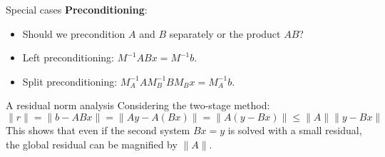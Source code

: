 \documentclass[aspectratio=169]{beamer}
\begin{document}
\begin{frame}{Special cases}
	\textbf{Preconditioning}:
	\begin{itemize}
		\item Should we precondition $A$ and $B$ separately or the product $AB$?
		\item Left preconditioning: $M^{-1}ABx = M^{-1}b$.
		\item Split preconditioning: $M_A^{-1}AM_B^{-1}BM_B x = M_A^{-1}b$.
	\end{itemize}
\end{frame}

\begin{frame}{A residual norm analysis}
	Considering the two-stage method:
	\begin{equation}
		\|r\| = \|b - ABx\| = \|Ay - A(Bx)\| = \|A(y - Bx)\| \le \|A\| \|y - Bx\|
	\end{equation}
	This shows that even if the second system $Bx=y$ is solved with a small residual, the global residual can be magnified by $\|A\|$.
\end{frame}
\end{document}
